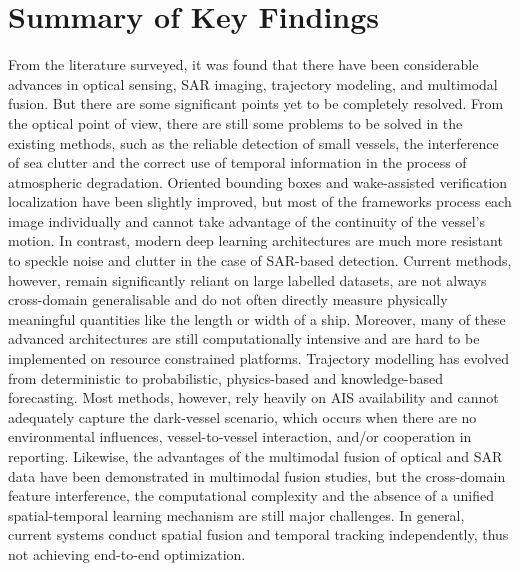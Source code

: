 \FloatBarrier

\section{Summary of Key Findings}From the literature surveyed, it was found that there have been considerable advances in optical sensing, SAR imaging, trajectory modeling, and multimodal fusion.  But there are some significant points yet to be completely resolved. From the optical point of view, there are still some problems to be solved in the existing methods, such as the reliable detection of small vessels, the interference of sea clutter and the correct use of temporal information in the process of atmospheric degradation. Oriented bounding boxes and wake-assisted verification localization have been slightly improved, but most of the frameworks process each image individually and cannot take advantage of the continuity of the vessel's motion. In contrast, modern deep learning architectures are much more resistant to speckle noise and clutter in the case of SAR-based detection. Current methods, however, remain significantly reliant on large labelled datasets, are not always cross-domain generalisable and do not often directly measure physically meaningful quantities like the length or width of a ship. Moreover, many of these advanced architectures are still computationally intensive and are hard to be implemented on resource constrained platforms. Trajectory modelling has evolved from deterministic to probabilistic, physics-based and knowledge-based forecasting. Most methods, however, rely heavily on AIS availability and cannot adequately capture the dark-vessel scenario, which occurs when there are no environmental influences, vessel-to-vessel interaction, and/or cooperation in reporting. Likewise, the advantages of the multimodal fusion of optical and SAR data have been demonstrated in multimodal fusion studies, but the cross-domain feature interference, the computational complexity and the absence of a unified spatial-temporal learning mechanism are still major challenges. In general, current systems conduct spatial fusion and temporal tracking independently, thus not achieving end-to-end optimization.

